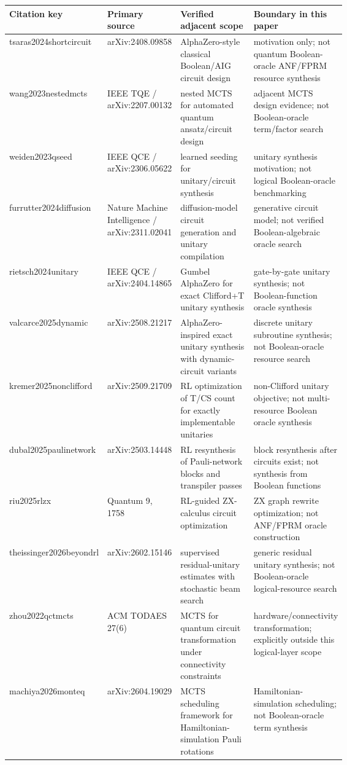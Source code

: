 \begin{tabularx}{\linewidth}{>{\raggedright\arraybackslash}p{0.20\linewidth}>{\raggedright\arraybackslash}p{0.18\linewidth}>{\raggedright\arraybackslash}p{0.26\linewidth}>{\raggedright\arraybackslash}X}
\toprule
Citation key & Primary source & Verified adjacent scope & Boundary in this paper \\
\midrule
tsaras2024shortcircuit & arXiv:2408.09858 & AlphaZero-style classical Boolean/AIG circuit design & motivation only; not quantum Boolean-oracle ANF/FPRM resource synthesis \\
wang2023nestedmcts & IEEE TQE / arXiv:2207.00132 & nested MCTS for automated quantum ansatz/circuit design & adjacent MCTS design evidence; not Boolean-oracle term/factor search \\
weiden2023qseed & IEEE QCE / arXiv:2306.05622 & learned seeding for unitary/circuit synthesis & unitary synthesis motivation; not logical Boolean-oracle benchmarking \\
furrutter2024diffusion & Nature Machine Intelligence / arXiv:2311.02041 & diffusion-model circuit generation and unitary compilation & generative circuit model; not verified Boolean-algebraic oracle search \\
rietsch2024unitary & IEEE QCE / arXiv:2404.14865 & Gumbel AlphaZero for exact Clifford+T unitary synthesis & gate-by-gate unitary synthesis; not Boolean-function oracle synthesis \\
valcarce2025dynamic & arXiv:2508.21217 & AlphaZero-inspired exact unitary synthesis with dynamic-circuit variants & discrete unitary subroutine synthesis; not Boolean-oracle resource search \\
kremer2025nonclifford & arXiv:2509.21709 & RL optimization of T/CS count for exactly implementable unitaries & non-Clifford unitary objective; not multi-resource Boolean oracle synthesis \\
dubal2025paulinetwork & arXiv:2503.14448 & RL resynthesis of Pauli-network blocks and transpiler passes & block resynthesis after circuits exist; not synthesis from Boolean functions \\
riu2025rlzx & Quantum 9, 1758 & RL-guided ZX-calculus circuit optimization & ZX graph rewrite optimization; not ANF/FPRM oracle construction \\
theissinger2026beyondrl & arXiv:2602.15146 & supervised residual-unitary estimates with stochastic beam search & generic residual unitary synthesis; not Boolean-oracle logical-resource search \\
zhou2022qctmcts & ACM TODAES 27(6) & MCTS for quantum circuit transformation under connectivity constraints & hardware/connectivity transformation; explicitly outside this logical-layer scope \\
machiya2026monteq & arXiv:2604.19029 & MCTS scheduling framework for Hamiltonian-simulation Pauli rotations & Hamiltonian-simulation scheduling; not Boolean-oracle term synthesis \\
\bottomrule
\end{tabularx}
